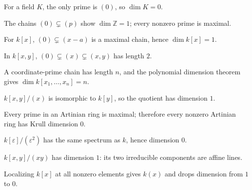 \begin{example}\label{ex:vi29-01}
For a field $K$, the only prime is $(0)$, so $\dim K=0$.
\end{example}

\begin{example}\label{ex:vi29-02}
The chains $(0)\subsetneq(p)$ show $\dim\mathbb Z=1$; every nonzero prime is maximal.
\end{example}

\begin{example}\label{ex:vi29-03}
For $k[x]$, $(0)\subsetneq(x-a)$ is a maximal chain, hence $\dim k[x]=1$.
\end{example}

\begin{example}\label{ex:vi29-04}
In $k[x,y]$, $(0)\subsetneq(x)\subsetneq(x,y)$ has length $2$.
\end{example}

\begin{example}\label{ex:vi29-05}
A coordinate-prime chain has length $n$, and the polynomial dimension theorem gives $\dim k[x_1,\ldots,x_n]=n$.
\end{example}

\begin{example}\label{ex:vi29-06}
$k[x,y]/(x)$ is isomorphic to $k[y]$, so the quotient has dimension $1$.
\end{example}

\begin{example}\label{ex:vi29-07}
Every prime in an Artinian ring is maximal; therefore every nonzero Artinian ring has Krull dimension $0$.
\end{example}

\begin{example}\label{ex:vi29-08}
$k[\varepsilon]/(\varepsilon^2)$ has the same spectrum as $k$, hence dimension $0$.
\end{example}

\begin{example}\label{ex:vi29-09}
$k[x,y]/(xy)$ has dimension $1$: its two irreducible components are affine lines.
\end{example}

\begin{example}\label{ex:vi29-10}
Localizing $k[x]$ at all nonzero elements gives $k(x)$ and drops dimension from $1$ to $0$.
\end{example}

